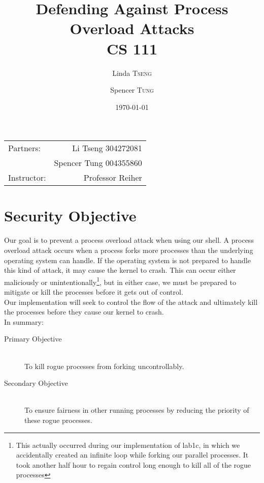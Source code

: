 \documentclass{article}
\title{Defending Against Process Overload Attacks \\ CS 111} %
\author{Linda \textsc{Tseng}
		\and
		Spencer \textsc{Tung}} %
\date{\today} %
\begin{document}
\maketitle %

\begin{center}
\begin{tabular}{l r} 
Partners: & Li Tseng 304272081 \\ %
& Spencer Tung 004355860 \\
Instructor: & Professor Reiher %
\end{tabular}
\end{center}



\section{Security Objective}

Our goal is to prevent a process overload attack when using our shell. A 
process overload attack occurs when a process forks more processes than the
underlying operating system can handle. If the operating system is not prepared
to handle this kind of attack, it may cause the kernel to crash. This can 
occur either maliciously or unintentionally\footnote{This actually occurred
during our implementation of lab1c, in which we accidentally created an 
infinite loop while forking our parallel processes. It took another half hour
to regain control long enough to kill all of the rogue processes}, but in 
either case, we must be prepared to mitigate or kill the processes before it 
gets out of control. \\ 

Our implementation will seek to control the flow of the attack and ultimately
kill the processes before they cause our kernel to crash. \\

In summary:
\begin{description}
\item[Primary Objective] \hfill \\
To kill rogue processes from forking uncontrollably.
\item[Secondary Objective] \hfill \\
To ensure fairness in other running processes by reducing the priority of these
rogue processes.
\end{description}
\end{document}
